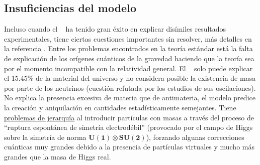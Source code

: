 

\subsection{Insuficiencias del modelo}

Incluso cuando el \ME ~ ha tenido gran éxito en explicar disímiles resultados experimentales,  tiene ciertas cuestiones importantes sin resolver, más detalles en la referencia \cite{ME}. Entre los problemas encontrados en la teoría estándar está la falta de explicación de los orígenes cuánticos de la gravedad haciendo que la teoría sea por el momento incompatible con la relatividad general. El \ME ~ solo puede explicar el 15.45\% de la material del universo y no considera posible la existencia de masa por parte de los neutrinos (cuestión refutada por los estudios de sus oscilaciones). No explica la presencia excesiva de materia que de antimateria, el modelo predice la creación y aniquilación en cantidades estadísticamente semejantes. Tiene \href{https://en.wikipedia.org/wiki/Hierarchy_problem}{problemas de jerarquía} al introducir partículas con masas a través del proceso de ``ruptura espontánea de simetría electrodébil'' (provocado por el campo de Higgs sobre la simetría de norma $\mathbf{U(1) \otimes SU(2)}$), forzando algunas correcciones cuánticas muy grandes debido a la presencia de partículas virtuales y mucho más grandes que la masa de Higgs real.


